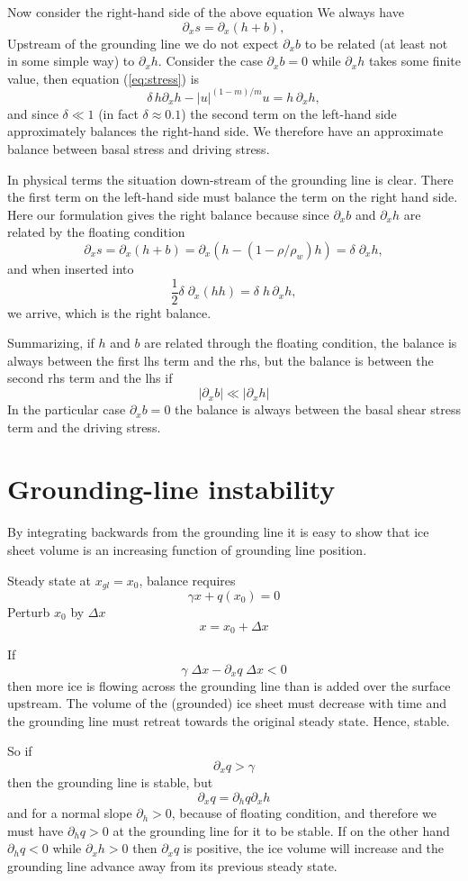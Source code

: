 \documentclass[10pt,a4paper]{book}
\newcommand{\p}{\partial}
\begin{document}
Now consider the right-hand side of the above equation
We always have
\[ 
\p_x s= \p_x (h+b) ,
\]
Upstream of the grounding line we do not expect $\p_x b$ to be related
(at least not in some simple way) to $\p_x h$. Consider the case
$\p_x b=0$ while $\p_x h$ takes some finite value, then
equation (\ref{eq:stress}) is
\begin{equation}
\delta \, h \p_x h  - |u|^{(1-m)/m} u  = h \, \p_x h  ,
\label{eq:sc4}
\end{equation}
and since $\delta \ll 1$ (in fact $\delta \approx 0.1$) the second
term on the left-hand side approximately balances the right-hand
side. We therefore have an approximate balance between basal stress
and driving stress.

In physical terms the situation down-stream of the grounding line is clear. There the
first term on the left-hand side must balance the term on the right
hand side. Here our formulation gives the right balance because since  $\p_x
b$ and $\p_x h$ are related by the floating condition
\[
\p_x s= \p_x(h+b)=\p_x (h-(1-\rho/\rho_w) h)=\delta \; \p_x h ,
\]
and when inserted into 
\begin{equation}
 \frac{1}{2} \delta \; \p_x \left (h h \right )  = \delta \; h \, \p_x h  ,
\label{eq:sc40}
\end{equation}
we arrive, which is the right balance.

Summarizing, if $h$ and $b$ are related
through the floating condition, the balance is always between the
first lhs term and the rhs, but  the balance is between the second rhs
term and the lhs if
\[
|\p_x b| \ll |\p_x h|
\] 
In the particular case $\p_x b=0$ the balance is always
between the basal shear stress term and the driving stress.


\section{Grounding-line instability}


By integrating backwards from the grounding line it is easy to show that ice
sheet volume is an increasing function of grounding line position.


Steady state at $x_{gl}=x_0$, balance requires
\[
\gamma x + q(x_0)=0
\]
Perturb $x_0$ by $\Delta x$
\[
  x=x_0 + \Delta x
\]

If
\[
\gamma \; \Delta x - \p_x q \; \Delta x < 0
\]
then more ice is flowing across the grounding line than is added over
the surface upstream. The volume of the (grounded) ice sheet must
decrease with time and the grounding line must retreat towards
the original steady state. Hence, stable.

So if
\[
  \p_x q > \gamma
\]
then the grounding line is stable, but
\[
\p_x q = \p_h q \p_x h
\]
and for a normal slope $\p_h >0$, because of floating condition, and
therefore we must have $\p_h q> 0$ at the grounding line for it to be
stable. If on the other hand $\p_h q<0$ while $\p_x h>0$ then $\p_x q$
is positive, the ice volume will increase and the grounding line
advance away from its previous steady state.
\end{document}
